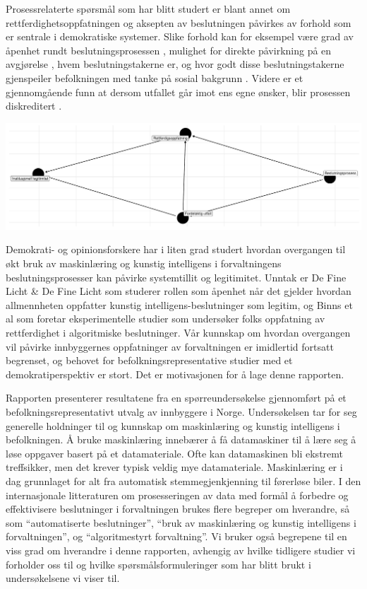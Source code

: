 \documentclass[
]{book}
\begin{document}
Prosessrelaterte spørsmål som har blitt studert er blant annet om rettferdighetsoppfatningen og aksepten av beslutningen påvirkes av forhold som er sentrale i demokratiske systemer.
Slike forhold kan for eksempel være grad av åpenhet rundt beslutningsprosessen \citep{de2014does}, mulighet for direkte påvirkning på en avgjørelse \citep{EJPR:EJPR2052, arnesen2017legitimacy, christensen2020matter}, hvem beslutningstakerne er, og hvor godt disse beslutningstakerne gjenspeiler befolkningen med tanke på sosial bakgrunn \citep{arnesen2018legitimacy, clayton2019all}.
Videre er et gjennomgående funn at dersom utfallet går imot ens egne ønsker, blir prosessen diskreditert \citep{esaiasson2016reconsidering}.

\includegraphics{NAV_files/figure-latex/dag-1.pdf}

Demokrati- og opinionsforskere har i liten grad studert hvordan overgangen til økt bruk av maskinlæring og kunstig intelligens i forvaltningens beslutningsprosesser kan påvirke systemtillit og legitimitet.
Unntak er De Fine Licht \& De Fine Licht \citeyearpar{de2020artificial} som studerer rollen som åpenhet når det gjelder hvordan allmennheten oppfatter kunstig intelligens-beslutninger som legitim, og Binns et al \citeyearpar{binns2018s} som foretar eksperimentelle studier som undersøker folks oppfatning av rettferdighet i algoritmiske beslutninger.
Vår kunnskap om hvordan overgangen vil påvirke innbyggernes oppfatninger av forvaltningen er imidlertid fortsatt begrenset, og behovet for befolkningsrepresentative studier med et demokratiperspektiv er stort.
Det er motivasjonen for å lage denne rapporten.

Rapporten presenterer resultatene fra en spørreundersøkelse gjennomført på et befolkningsrepresentativt utvalg av innbyggere i Norge.
Undersøkelsen tar for seg generelle holdninger til og kunnskap om maskinlæring og kunstig intelligens i befolkningen.
Å bruke maskinlæring innebærer å få datamaskiner til å lære seg å løse oppgaver basert på et datamateriale.
Ofte kan datamaskinen bli ekstremt treffsikker, men det krever typisk veldig mye datamateriale.
Maskinlæring er i dag grunnlaget for alt fra automatisk stemmegjenkjenning til førerløse biler.
I den internasjonale litteraturen om prosesseringen av data med formål å forbedre og effektivisere beslutninger i forvaltningen brukes flere begreper om hverandre, så som ``automatiserte beslutninger'', ``bruk av maskinlæring og kunstig intelligens i forvaltningen'', og ``algoritmestyrt forvaltning''.
Vi bruker også begrepene til en viss grad om hverandre i denne rapporten, avhengig av hvilke tidligere studier vi forholder oss til og hvilke spørsmålsformuleringer som har blitt brukt i undersøkelsene vi viser til.
\end{document}
